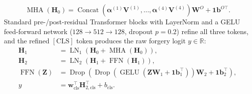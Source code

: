 \documentclass[fleqn,10pt]{wlscirep}
\begin{document}
\begin{equation}
\operatorname{MHA}(\mathbf{H}_0) = \operatorname{Concat}\!\left(\boldsymbol{\alpha}^{(1)}\mathbf{V}^{(1)}, \dots, \boldsymbol{\alpha}^{(4)}\mathbf{V}^{(4)}\right)\mathbf{W}^O + \mathbf{1}\mathbf{b}^{O\top}.
\label{eq:mha_out}
\end{equation}
Standard pre-/post-residual Transformer blocks with LayerNorm and a GELU feed-forward network ($128 \to 512 \to 128$, dropout $p=0.2$) refine all three tokens, and the refined $[\text{CLS}]$ token produces the raw forgery logit $y \in \mathbb{R}$:
\begin{align}
\mathbf{H}_1 &= \operatorname{LN}_1\!\left(\mathbf{H}_0 + \operatorname{MHA}(\mathbf{H}_0)\right), \label{eq:res1}\\
\mathbf{H}_2 &= \operatorname{LN}_2\!\left(\mathbf{H}_1 + \operatorname{FFN}(\mathbf{H}_1)\right), \label{eq:res2}\\
\operatorname{FFN}(\mathbf{Z}) &= \operatorname{Drop}\!\left(\operatorname{Drop}\!\left(\operatorname{GELU}(\mathbf{Z}\mathbf{W}_1 + \mathbf{1}\mathbf{b}_1^\top)\right)\mathbf{W}_2 + \mathbf{1}\mathbf{b}_2^\top\right), \label{eq:ffn}\\
y &= \mathbf{w}_{\text{cls}}^\top \mathbf{H}_{2,\text{cls}}^\top + b_{\text{cls}}. \label{eq:logit}
\end{align}
\end{document}
